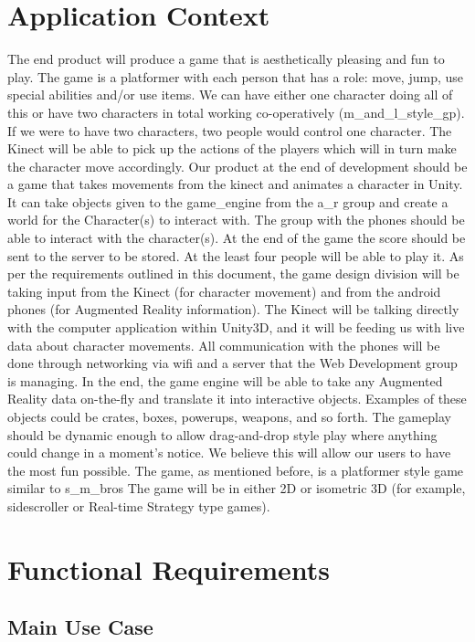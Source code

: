 \documentclass[10pt,letterpaper,oneside,english]{report}
\begin{document}
\section{Application Context}
\label{Application Context}
	The end product will produce a game that is aesthetically pleasing and fun to play. The game is a platformer with each person that has a role: move, jump, use special abilities and/or use items. We can have either one character doing all of this or have two characters in total working co-operatively (\gls{m_and_l_style_gp}). If we were to have two characters, two people would control one character. The Kinect will be able to pick up the actions of the players which will in turn make the character move accordingly. 
Our product at the end of development should be a game that takes movements from the \gls{kinect} and animates a character in Unity. It can take objects given to the \gls{game_engine} from the \gls{a_r} group and create a world for the Character(s) to interact with. The group with the phones should be able to interact with the character(s). At the end of the game the score should be sent to the server to be stored. At the least four people will be able to play it.
As per the requirements outlined in this document, the game design division will be taking input from the Kinect (for character movement) and from the android phones (for Augmented Reality information). The Kinect will be talking directly with the computer application within Unity3D, and it will be feeding us with live data about character movements. All communication with the phones will be done through networking via wifi and a server that the Web Development group is managing.
In the end, the game engine will be able to take any Augmented Reality data on-the-fly and translate it into interactive objects. Examples of these objects could be crates, boxes, powerups, weapons, and so forth. The gameplay should be dynamic enough to allow drag-and-drop style play where anything could change in a moment’s notice. We believe this will allow our users to have the most fun possible.
The game, as mentioned before, is a platformer style game similar to \gls{s_m_bros} The game will be in either 2D or isometric 3D (for example, sidescroller or Real-time Strategy type games).


\section{Functional Requirements}
\label{Functional Requirements}
\subsection{Main Use Case}
\end{document}
